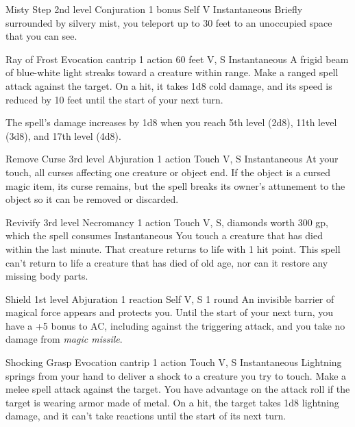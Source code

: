 \documentclass[10pt,a4paper,twoside,bg=print,twocolumn,openany,nodeprecatedcode]{dndbook}
\begin{document}


\DndSpellHeader%
{Misty Step}
{2nd level Conjuration}
{1 bonus}
{Self}
{V}
{Instantaneous}
Briefly surrounded by silvery mist, you teleport up to 30 feet to an unoccupied space that you can see.



\DndSpellHeader%
{Ray of Frost}
{Evocation cantrip}
{1 action}
{60 feet}
{V, S}
{Instantaneous}
A frigid beam of blue-white light streaks toward a creature within range. Make a ranged spell attack against the target. On a hit, it takes 1d8 cold damage, and its speed is reduced by 10 feet until the start of your next turn.

The spell's damage increases by 1d8 when you reach 5th level (2d8), 11th level (3d8), and 17th level (4d8).



\DndSpellHeader%
{Remove Curse}
{3rd level Abjuration}
{1 action}
{Touch}
{V, S}
{Instantaneous}
At your touch, all curses affecting one creature or object end. If the object is a cursed magic item, its curse remains, but the spell breaks its owner's attunement to the object so it can be removed or discarded.



\DndSpellHeader%
{Revivify}
{3rd level Necromancy}
{1 action}
{Touch}
{V, S, diamonds worth 300 gp, which the spell consumes}
{Instantaneous}
You touch a creature that has died within the last minute. That creature returns to life with 1 hit point. This spell can't return to life a creature that has died of old age, nor can it restore any missing body parts.



\DndSpellHeader%
{Shield}
{1st level Abjuration}
{1 reaction}
{Self}
{V, S}
{1 round}
An invisible barrier of magical force appears and protects you. Until the start of your next turn, you have a +5 bonus to AC, including against the triggering attack, and you take no damage from \textit{magic missile}.



\DndSpellHeader%
{Shocking Grasp}
{Evocation cantrip}
{1 action}
{Touch}
{V, S}
{Instantaneous}
Lightning springs from your hand to deliver a shock to a creature you try to touch. Make a melee spell attack against the target. You have advantage on the attack roll if the target is wearing armor made of metal. On a hit, the target takes 1d8 lightning damage, and it can't take reactions until the start of its next turn.
\end{document}
